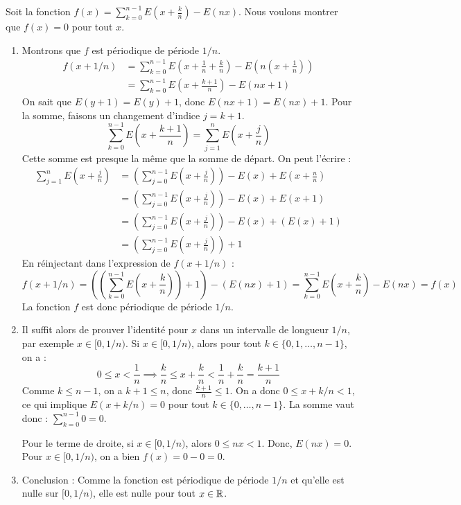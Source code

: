 \documentclass[solutions]{exercices}
\begin{document}
\begin{solution}
	Soit la fonction $f(x) = \sum_{k=0}^{n-1} E(x + \frac{k}{n}) - E(nx)$. Nous voulons montrer que $f(x)=0$ pour tout $x$.
	\begin{enumerate}
		\item Montrons que $f$ est périodique de période $1/n$.
		      \begin{align*}
			      f(x+1/n) & = \sum_{k=0}^{n-1} E\left(x + \frac{1}{n} + \frac{k}{n}\right) - E\left(n(x+\frac{1}{n})\right) \\
			               & = \sum_{k=0}^{n-1} E\left(x + \frac{k+1}{n}\right) - E(nx+1)
		      \end{align*}
		      On sait que $E(y+1) = E(y)+1$, donc $E(nx+1)=E(nx)+1$.
		      Pour la somme, faisons un changement d'indice $j=k+1$.
		      \[ \sum_{k=0}^{n-1} E\left(x + \frac{k+1}{n}\right) = \sum_{j=1}^{n} E\left(x + \frac{j}{n}\right) \]
		      Cette somme est presque la même que la somme de départ. On peut l'écrire :
		      \begin{align*}
			      \sum_{j=1}^{n} E\left(x + \frac{j}{n}\right) & = \left(\sum_{j=0}^{n-1} E\left(x + \frac{j}{n}\right)\right) - E(x) + E\left(x+\frac{n}{n}\right) \\
			                                                   & = \left(\sum_{j=0}^{n-1} E\left(x + \frac{j}{n}\right)\right) - E(x) + E(x+1)                      \\
			                                                   & = \left(\sum_{j=0}^{n-1} E\left(x + \frac{j}{n}\right)\right) - E(x) + (E(x)+1)                    \\
			                                                   & = \left(\sum_{j=0}^{n-1} E\left(x + \frac{j}{n}\right)\right) + 1
		      \end{align*}
		      En réinjectant dans l'expression de $f(x+1/n)$ :
		      \[ f(x+1/n) = \left(\left(\sum_{k=0}^{n-1} E\left(x + \frac{k}{n}\right)\right) + 1\right) - (E(nx)+1) = \sum_{k=0}^{n-1} E\left(x + \frac{k}{n}\right) - E(nx) = f(x) \]
		      La fonction $f$ est donc périodique de période $1/n$.

		\item Il suffit alors de prouver l'identité pour $x$ dans un intervalle de longueur $1/n$, par exemple $x \in [0, 1/n)$.
		      Si $x \in [0, 1/n)$, alors pour tout $k \in \{0, 1, \dots, n-1\}$, on a :
		      \[ 0 \leq x < \frac{1}{n} \implies \frac{k}{n} \leq x+\frac{k}{n} < \frac{1}{n}+\frac{k}{n} = \frac{k+1}{n} \]
		      Comme $k \leq n-1$, on a $k+1 \leq n$, donc $\frac{k+1}{n} \leq 1$.
		      On a donc $0 \leq x + k/n < 1$, ce qui implique $E(x+k/n) = 0$ pour tout $k \in \{0, \dots, n-1\}$.
		      La somme vaut donc : $\sum_{k=0}^{n-1} 0 = 0$.

		      Pour le terme de droite, si $x \in [0, 1/n)$, alors $0 \leq nx < 1$.
		      Donc, $E(nx)=0$.
		      Pour $x \in [0, 1/n)$, on a bien $f(x) = 0 - 0 = 0$.

		\item Conclusion : Comme la fonction est périodique de période $1/n$ et qu'elle est nulle sur $[0, 1/n)$, elle est nulle pour tout $x \in \mathbb{R}$.
	\end{enumerate}
\end{solution}
\end{document}
